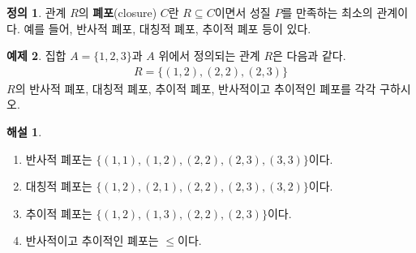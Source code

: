 \documentclass[b5paper, 11pt]{book}
\theoremstyle{definition}
\newtheorem{defn}{정의}[chapter]
\newtheorem{ex}[defn]{예제}
\newtheorem*{ans*}{해설}
\begin{document}
\begin{defn}
    관계 $R$의 \textbf{폐포}(closure) $C$란 $R \subseteq C$이면서 성질 $P$를 만족하는 최소의
    관계이다. 예를 들어, 반사적 폐포, 대칭적 폐포, 추이적 폐포 등이 있다. 
\end{defn}
\begin{ex}
    집합 $A = \{1, 2, 3\}$과 $A$ 위에서 정의되는 관계 $R$은 다음과 같다.
    \begin{align*}
        R = \{(1,2), (2, 2), (2, 3)\}
    \end{align*}
    $R$의 반사적 폐포, 대칭적 폐포, 추이적 폐포, 반사적이고 추이적인 폐포를 각각 구하시오.
\end{ex}
\begin{ans*}
    \begin{enumerate}
        \item 반사적 폐포는 $\{(1, 1), (1, 2), (2, 2), (2, 3), (3, 3)\}$이다.
        \item 대칭적 폐포는 $\{(1, 2), (2, 1), (2, 2), (2, 3), (3, 2)\}$이다.
        \item 추이적 폐포는 $\{(1, 2),(1, 3), (2, 2), (2, 3) \}$이다.
        \item 반사적이고 추이적인 폐포는 $\le$이다. 
    \end{enumerate}
\end{ans*}
\end{document}
